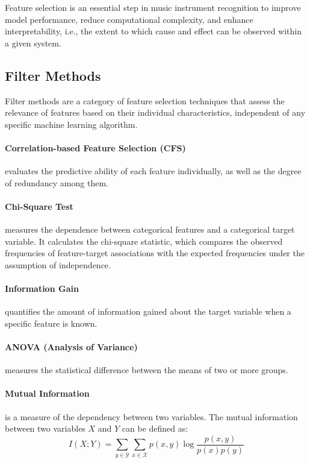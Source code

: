 Feature selection is an essential step in music instrument recognition to improve model performance, reduce computational complexity, and enhance interpretability, i.e., the extent to which cause and effect can be observed within a given system.

\subsection{Filter Methods}

Filter methods are a category of feature selection techniques that assess the relevance of features based on their individual characteristics, independent of any specific machine learning algorithm.

\paragraph{Correlation-based Feature Selection (CFS)} evaluates the predictive ability of each feature individually, as well as the degree of redundancy among them.

\paragraph{Chi-Square Test} measures the dependence between categorical features and a categorical target variable. It calculates the chi-square statistic, which compares the observed frequencies of feature-target associations with the expected frequencies under the assumption of independence.

\paragraph{Information Gain} quantifies the amount of information gained about the target variable when a specific feature is known.

\paragraph{ANOVA (Analysis of Variance)} measures the statistical difference between the means of two or more groups.

\paragraph{Mutual Information} is a measure of the dependency between two variables. The mutual information between two variables $X$ and $Y$ can be defined as:
\begin{equation}
  I(X; Y) = \sum_{y \in \mathcal{Y}} \sum_{x \in \mathcal{X}} p(x,y) \log \frac{p(x,y)}{p(x)p(y)}
  \label{eq:mutual-info}
\end{equation}

